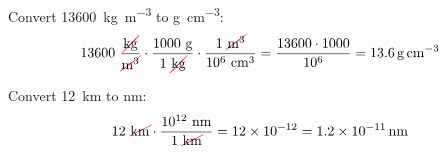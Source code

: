 \begin{example}
    Convert \qty{13600}{\kilo\g\per\cubic\metre} to \unit{\g\per\cubic\centi\metre}:
    \begin{equation*}
        13600\ \dfrac{\cancelred{\unit{\kilo\g}}}{\cancel{\unit{\cubic\metre}}} \cdot \dfrac{1000\ \unit{\g}}{1\ \cancelred{\unit{\kilo\g}}} \cdot \dfrac{1\ \cancelred{\unit{\cubic\metre}}}{\num{e6}\ \unit{\cubic\centi\metre}} = \dfrac{13600 \cdot 1000}{\num{e6}} = \qty{13.6}{\g\per\cubic\centi\metre}
    \end{equation*}
\end{example}

\begin{example}
    Convert \qty{12}{\kilo\metre} to \unit{\nano\metre}:
    \begin{equation*}
        12\ \cancelred{\unit{\kilo\metre}} \cdot  \dfrac{\num{e12}\ \unit{\nano\metre}}{ 1\ \cancelred{\unit{\kilo\metre}}} = \num{12e-12} = \qty{1.2e-11}{\nano\metre}
    \end{equation*}
\end{example}

